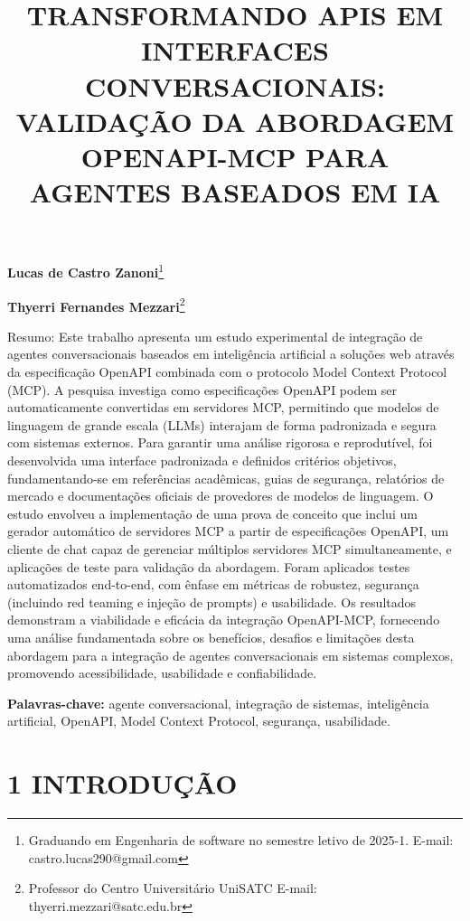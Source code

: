 \documentclass[
]{article}
\title{\textbf{TRANSFORMANDO APIS EM INTERFACES CONVERSACIONAIS:
VALIDAÇÃO DA ABORDAGEM OPENAPI-MCP PARA AGENTES BASEADOS EM IA}}
\author{}
\date{}
\begin{document}
\maketitle

\textbf{Lucas de Castro Zanoni}\footnote{Graduando em Engenharia de
  software no semestre letivo de 2025-1. E-mail:
  castro.lucas290@gmail.com}

\textbf{Thyerri Fernandes Mezzari}\footnote{Professor do Centro
  Universitário UniSATC E-mail: thyerri.mezzari@satc.edu.br}

Resumo: Este trabalho apresenta um estudo experimental de integração de
agentes conversacionais baseados em inteligência artificial a soluções
web através da especificação OpenAPI combinada com o protocolo Model
Context Protocol (MCP). A pesquisa investiga como especificações OpenAPI
podem ser automaticamente convertidas em servidores MCP, permitindo que
modelos de linguagem de grande escala (LLMs) interajam de forma
padronizada e segura com sistemas externos. Para garantir uma análise
rigorosa e reprodutível, foi desenvolvida uma interface padronizada e
definidos critérios objetivos, fundamentando-se em referências
acadêmicas, guias de segurança, relatórios de mercado e documentações
oficiais de provedores de modelos de linguagem. O estudo envolveu a
implementação de uma prova de conceito que inclui um gerador automático
de servidores MCP a partir de especificações OpenAPI, um cliente de chat
capaz de gerenciar múltiplos servidores MCP simultaneamente, e
aplicações de teste para validação da abordagem. Foram aplicados testes
automatizados end-to-end, com ênfase em métricas de robustez, segurança
(incluindo red teaming e injeção de prompts) e usabilidade. Os
resultados demonstram a viabilidade e eficácia da integração
OpenAPI-MCP, fornecendo uma análise fundamentada sobre os benefícios,
desafios e limitações desta abordagem para a integração de agentes
conversacionais em sistemas complexos, promovendo acessibilidade,
usabilidade e confiabilidade.

\textbf{Palavras-chave:} agente conversacional, integração de sistemas,
inteligência artificial, OpenAPI, Model Context Protocol, segurança,
usabilidade.

\section{1 INTRODUÇÃO}\label{introduuxe7uxe3o}
\end{document}
